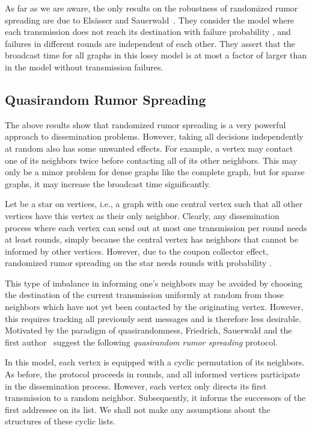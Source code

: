 \documentclass[12pt]{article}
\begin{document}
{ 
    As far as we are aware, the only results on the robustness of randomized rumor spreading are due to Els\"asser and Sauerwald~\cite{ES06full}. They consider the model where each transmission does not reach its destination with failure probability , and failures in different rounds are independent of each other. They assert that the broadcast time for all graphs in this lossy model is at most a factor of  larger than in the model without transmission failures.
    
\subsection{Quasirandom Rumor Spreading}

  The above results show that randomized rumor spreading is a very powerful approach to dissemination problems. However, taking all decisions independently at random also has some unwanted effects. For example, a vertex may contact one of its neighbors twice before contacting all of its other neighbors. This may only be a minor problem for dense graphs like the complete graph, but for sparse graphs, it may increase the broadcast time significantly. 
  
  Let  be a star on  vertices, i.e., a graph with one central vertex such that all other vertices have this vertex as their only neighbor. Clearly, any dissemination process where each vertex can send out at most one transmission per round needs at least  rounds, simply because the central vertex has  neighbors that cannot be informed by other vertices. However, due to the coupon collector effect, randomized rumor spreading on the star needs  rounds with probability . 
  
  This type of imbalance in informing one's neighbors may be avoided by choosing the destination of the current transmission uniformly at random from those neighbors which have not yet been contacted by the originating vertex. However, this requires tracking all previously sent messages and is therefore less desirable. Motivated by the paradigm of quasirandomness, Friedrich, Sauerwald and the first author~\cite{DFS08} suggest the following \emph{quasirandom rumor spreading} protocol.
  
  In this model, each vertex is equipped with a cyclic permutation of its neighbors. As before, the protocol proceeds in rounds, and all informed vertices participate in the dissemination process. However, each vertex only directs its first transmission to a random neighbor. Subsequently, it informs the successors of the first addressee on its list. We shall not make any assumptions about the structures of these cyclic lists.

}
\end{document}
